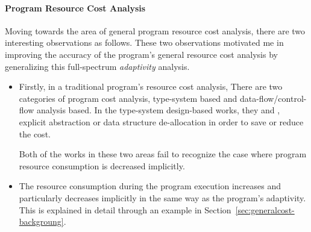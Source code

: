 \paragraph{Program Resource Cost Analysis}
\label{sec:intro-cost}
Moving towards the area of general program resource cost analysis,
there are two interesting observations as follows.
These two observations motivated me in 
improving the accuracy of the program's general resource cost analysis
by generalizing this full-spectrum \emph{adaptivity} analysis.
\begin{itemize}
 \item Firstly, in a traditional program's resource cost analysis,
 There are two categories of program cost analysis, type-system based and data-flow/control-flow analysis based. 
 In the type-system design-based works, they \cite{GustafssonEL05} and \cite{hoffmann_jost_2022}, explicit abstraction or data structure de-allocation in order to save or reduce the cost.
 
 Both of the
 works in these two areas fail to recognize the case where program resource consumption is decreased implicitly.
 \item The resource consumption during the program 
 execution increases and particularly decreases implicitly in the same way as the program's adaptivity. 
 This is explained in detail through an example in Section~\ref*{sec:generalcost-backgroung}.
\end{itemize}
